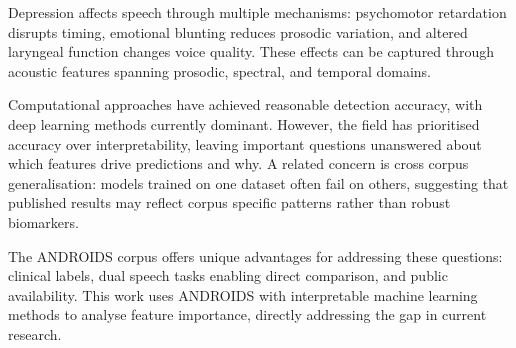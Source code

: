 Depression affects speech through multiple mechanisms: psychomotor retardation disrupts timing, emotional blunting reduces prosodic variation, and altered laryngeal function changes voice quality. These effects can be captured through acoustic features spanning prosodic, spectral, and temporal domains.

Computational approaches have achieved reasonable detection accuracy, with deep learning methods currently dominant. However, the field has prioritised accuracy over interpretability, leaving important questions unanswered about which features drive predictions and why. A related concern is cross corpus generalisation: models trained on one dataset often fail on others, suggesting that published results may reflect corpus specific patterns rather than robust biomarkers.

The ANDROIDS corpus offers unique advantages for addressing these questions: clinical labels, dual speech tasks enabling direct comparison, and public availability. This work uses ANDROIDS with interpretable machine learning methods to analyse feature importance, directly addressing the gap in current research.
